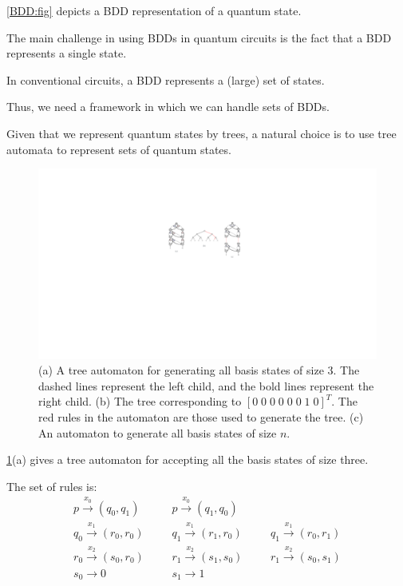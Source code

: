 \cref{BDD:fig} depicts a BDD representation of a quantum state.

The main challenge in using BDDs in quantum circuits is the fact that a BDD represents a single state.

In conventional circuits, a BDD represents a (large) set of states.

Thus, we need a framework in which we can handle sets of BDDs.

Given that we represent quantum states by trees, a natural choice is to use tree automata to represent sets of quantum states.


\begin{figure}[ht] 
    \centering
    \includegraphics[scale=0.8]{Figures/Automata/aut3} 
    \caption{(a) A tree automaton for generating all basis states of size $3$.
      The dashed lines represent the left child, and the bold lines represent the right child.
      (b) The tree corresponding to $[0\;0\;0\;0\;0\;0\;1\;0]^T$. The red rules in the automaton are those used to generate the tree.
      (c) An automaton to generate all basis states of size $n$.}
    \label{automata:fig}
\end{figure}


\cref{automata:fig}(a) gives a tree automaton for accepting all the basis states of size three.

The set of rules is:
\[
\begin{array}{lll}
p \xrightarrow{x_0} (q_0, q_1) &
\;\;\;\;\;\; p \xrightarrow{x_0} (q_1, q_0) & \\
q_0 \xrightarrow{x_1} (r_0, r_0) &
\;\;\;\;\;\; q_1 \xrightarrow{x_1} (r_1, r_0) &
\;\;\;\;\;\; q_1 \xrightarrow{x_1} (r_0, r_1) \\
r_0 \xrightarrow{x_2} (s_0, r_0) &
\;\;\;\;\;\; r_1 \xrightarrow{x_2} (s_1, s_0) &
\;\;\;\;\;\; r_1 \xrightarrow{x_2} (s_0, s_1) \\
s_0 \xrightarrow{} 0 &
\;\;\;\;\;\; s_1 \xrightarrow{} 1
\end{array}
\]

